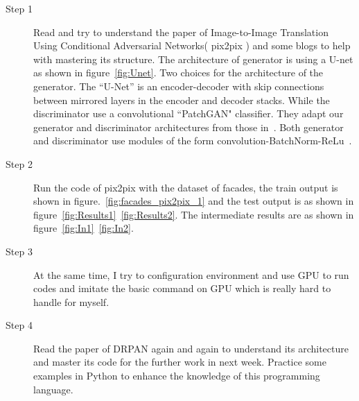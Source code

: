 \documentclass[a4paper]{article}
\begin{document}
\begin{description}
\item [Step 1]
Read and try to understand the paper of Image-to-Image Translation Using Conditional Adversarial Networks( pix2pix ) and some blogs to help with mastering its structure. The architecture of generator is using a U-net as shown in figure~\ref{fig:Unet}. Two choices for the architecture of the generator. The
“U-Net” is an encoder-decoder with skip connections between mirrored layers in the encoder and decoder stacks. While the discriminator use a convolutional ``PatchGAN" classifier. They adapt our generator and discriminator architectures from those in~\cite{Radford2016Unsupervised}. Both generator and discriminator use modules of the form convolution-BatchNorm-ReLu~\cite{Ioffe2015Batch}.
\item[Step 2]
Run the code of pix2pix with the dataset of facades, the train output is shown in figure.~\ref{fig:facades_pix2pix_1} and the test output is as shown in figure~\ref{fig:Results1}~\ref{fig:Results2}. The intermediate results are as shown in figure~\ref{fig:In1}~\ref{fig:In2}.
\item[Step 3]
 At the same time, I try to configuration environment and use GPU to run codes and imitate the basic command on GPU which is really hard to handle for myself.
\item[Step 4]
Read the paper of DRPAN again and again to understand its architecture and master its code for the further work in next week. Practice some examples in Python to enhance the knowledge of this programming language.
\end{description}
\end{document}
